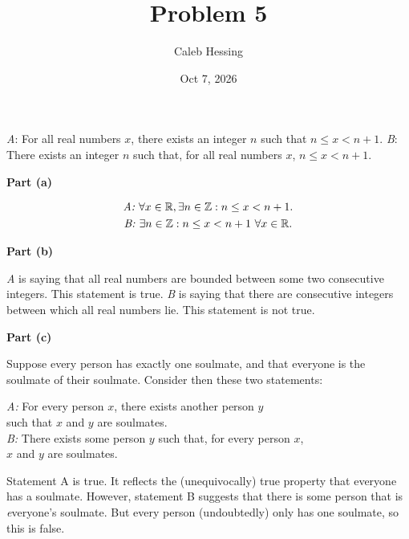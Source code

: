 \documentclass{article} %
\title{Problem 5}
\author{Caleb Hessing}
\date{Oct 7, 2026}
\newcommand{\emptyline}{\vspace{\baselineskip}}
\begin{document}
\maketitle

\begin{center}
\textit A: For all real numbers $x$, there exists an integer $n$ such that $n \le x < n+1$.
\textit B: There exists an integer $n$ such that, for all real numbers $x$, $n \le x < n+1$.
\end{center}

\textbf{Part (a)} 

\[\begin{gathered} 
  \textit{A: } \forall x \in \mathbb R, \exists n \in \mathbb Z : n \le x < n + 1. \\
  \textit{B: } \exists n \in \mathbb Z : n \le x < n + 1 \nobreakspace \forall x \in \mathbb R.  
\end{gathered}\]

\emptyline
\textbf{Part (b)} 

\textit A is saying that all real numbers are bounded between some two consecutive integers. This statement is true.
\textit B is saying that there are consecutive integers between which all real numbers lie. This statement is not true.

\emptyline
\textbf{Part (c)}

Suppose every person has exactly one soulmate, and that everyone is the soulmate of their soulmate. 
Consider then these two statements:

\begin{center}
    \textit {A: } For every person $x$, there exists another person $y$ \\ such that $x$ and $y$ are soulmates. \\
    \textit {B: } There exists some person $y$ such that, for every person $x$, \\ $x$ and $y$ are soulmates.
\end{center}

Statement A is true. It reflects the (unequivocally) true property that everyone has a soulmate.
However, statement B suggests that there is some person that is \textit everyone's soulmate.
But every person (undoubtedly) only has one soulmate, so this is false. 
\end{document}
